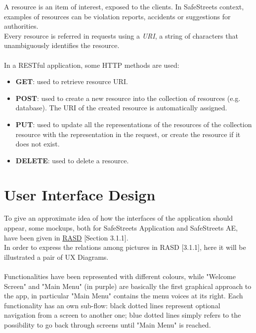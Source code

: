 \documentclass{article}
\begin{document}
				A resource is an item of interest, exposed to the clients. In SafeStreets context, examples of resources can be violation reports, accidents or suggestions for authorities.\\
				Every resource is referred in requests using a \textit{URI}, a string of characters that unambiguously identifies the resource.\\
				\\			
				In a RESTful application, some HTTP methods are used:
				
				\begin{itemize}
					\item {\textbf{GET}}: used to retrieve resource URI.
					\item {\textbf{POST}}: used to create a new resource into the collection of resources (e.g. database). The URI of the created resource is automatically assigned.
					\item {\textbf{PUT}}: used to update all the representations of the resources of the collection resource with the representation in the request, or create the resource if it does not exist.
					\item {\textbf{DELETE}}: used to delete a resource.
				\end{itemize}
			
		
	\clearpage	
	\section{User Interface Design}
		To give an approximate idea of how the interfaces of the application should appear, some mockups, both for SafeStreets Application and SafeStreets AE, have been given in \href{run:d:../DeliveryFolder/RASD1.pdf}{RASD} [Section 3.1.1].\\ 
		In order to express the relations among pictures in RASD [3.1.1], here it will be illustrated a pair of UX Diagrams.\\
		\\
		Functionalities have been represented with different colours, while "Welcome Screen" and "Main Menu" (in purple) are basically the first graphical approach to the app, in particular "Main Menu" contains the menu voices at its right.
		Each functionality has an own sub-flow: black dotted lines represent optional navigation from a screen to another one; blue dotted lines simply refers to the possibility to go back through screens until "Main Menu" is reached.
		
\end{document}
